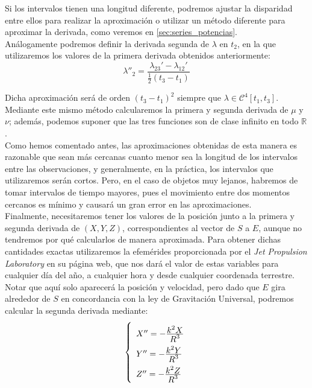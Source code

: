 Si los intervalos tienen una longitud diferente, podremos ajustar la disparidad entre ellos para realizar la aproximación o utilizar un método diferente para aproximar la derivada, como veremos en \ref{sec:series_potencias}.\\

Análogamente podremos definir la derivada segunda de $\lambda$ en $t_2$, en la que utilizaremos los valores de la primera derivada obtenidos anteriormente:
\[
\lambda''_2=\frac{\lambda_{23}'-\lambda_{12}'}{\frac{1}{2}(t_3-t_1)}
\]

Dicha aproximación será de orden $(t_3-t_1)^2$ siempre que $\lambda\in\mathcal{C}^4[t_1,t_3]$. Mediante este mismo método calcularemos la primera y segunda derivada de $\mu$ y $\nu$; además, podemos suponer que las tres funciones son de clase infinito en todo $\mathbb{R}$. \cite{MNII}\\

Como hemos comentado antes, las aproximaciones obtenidas de esta manera es razonable que sean más cercanas cuanto menor sea la longitud de los intervalos entre las observaciones, y generalmente, en la práctica, los intervalos que utilizaremos serán cortos. Pero, en el caso de objetos muy lejanos, habremos de tomar intervalos de tiempo mayores, pues el movimiento entre dos momentos cercanos es mínimo y causará un gran error en las aproximaciones.\\

Finalmente, necesitaremos tener los valores de la posición junto a la primera y segunda derivada de $(X,Y,Z)$, correspondientes al vector de $S$ a $E$, aunque no tendremos por qué calcularlos de manera aproximada. Para obtener dichas cantidades exactas utilizaremos la efemérides proporcionada por el \textit{Jet Propulsion Laboratory} \cite{jpl} en su página web, que nos dará el valor de estas variables para cualquier día del año, a cualquier hora y desde cualquier coordenada terrestre. Notar que aquí solo aparecerá la posición y velocidad, pero dado que $E$ gira alrededor de $S$ en concordancia con la ley de Gravitación Universal, podremos calcular la segunda derivada mediante:
\begin{align}
\left\{
\def\arraystretch{2}
\begin{array}{l}
	X'' = -\ddfrac{k^2X}{R^3}\\
	Y'' = -\ddfrac{k^2Y}{R^3}\\
	Z'' = -\ddfrac{k^2Z}{R^3}
\end{array}
\right.
\label{eq:ley_gravitacion_S_E}
\end{align}

